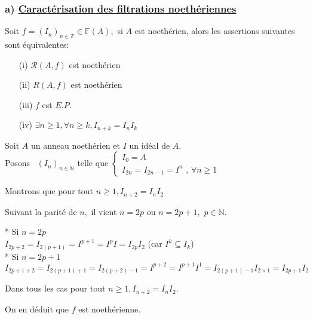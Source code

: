 \subsubsection{a) \underline{Caractérisation des filtrations noethériennes}} 
\begin{maproposition}
	Soit $f=(I_{n})_{n \in \mathbb{Z}}\in \mathbb{F}(A),$ si $A$ est noethérien, alors les assertions suivantes sont équivalentes:
	\begin{enumerate}
		\item[(i)] $\mathcal{R}(A,f)$ est noethérien
		\item[(ii)] $R(A,f)$ est noethérien
		\item[(iii)] $f$ est $E.P.$
		\item[(iv)] $\exists n \geqslant 1,\forall n \geqslant k, I_{n+k} = I_nI_k$
	\end{enumerate}
\end{maproposition}
\begin{monexemple}
	Soit $A$ un anneau noethérien et $I$ un idéal de $A$.\\
	Posons \ $(I_{n})_{n\in \mathbb{N}}$ telle que $\left\{ 
	\begin{array}{c}
		I_{0}=A \\ 
		I_{2n}=I_{2n-1}=I^{n}\text{ , }\forall n\geq 1
	\end{array}
	\right. $
	
	Montrons que pour tout $n\geq 1,I_{n+2}=I_{n}I_{2}$
	
	Suivant la parité de $n,$ il vient $n=2p$ ou $n=2p+1,$ $p\in \mathbb{N}.$
	
	* Si $n=2p$ \\
	$I_{2p+2}=I_{2(p+1)}=I^{p+1}=I^{p}I=I_{2p}I_{2}$ (car $I^{k}\subseteq I_{k}$) \\
	* Si $n=2p+1$ \\
	$I_{2p+1+2}=I_{2(p+1)+1}=I_{2(p+2)-1}=I^{p+2}=I^{p+1}I^{1}=I_{2(p+1)-1}I_{2\times 1}=I_{2p+1}I_{2}$
	
	Dans tous les cas pour tout $n\geq 1,I_{n+2}=I_{n}I_{2}.$
	
	On en déduit que $f$ est noethérienne.
\end{monexemple}

